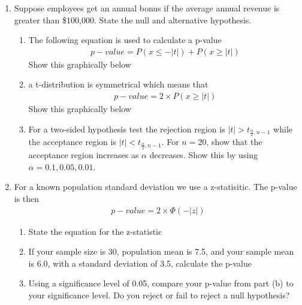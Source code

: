 \begin{enumerate}
\item Suppose employees get an annual bonus if the average annual revenue is greater than \$100,000. State the null and alternative hypothesis.
\begin{enumerate}
\item The following equation is used to calculate a p-value
\begin{eqnarray*}
p-value = P(x \le -|t|) + P(x \ge |t|)
\end{eqnarray*}
Show this graphically below \\
\item a t-distribution is symmetrical which means that 
\begin{eqnarray*}
p-value = 2 \times P(x \ge |t|)
\end{eqnarray*}
Show this graphically below \\ 
\item For a two-sided hypothesis test the rejection region is $|t| > t_{\frac{\alpha}{2},n-1}$ while the acceptance region is $|t| < t_{\frac{\alpha}{2},n-1}$. For $n=20$, show that the acceptance region increases as $\alpha$ decreases. Show this by using $\alpha = 0.1, 0.05, 0.01$.
\end{enumerate}
\item For a known population standard deviation we use a z-statisitic. The p-value is then 
\begin{eqnarray*}
p-value = 2\times \Phi (-|z|)
\end{eqnarray*}
\begin{enumerate}
\item State the equation for the z-statistic
\item If your sample size is 30, population mean is 7.5, and your sample mean is 6.0, with a standard deviation of 3.5, calculate the p-value
\item Using a significance level of 0.05, compare your p-value from part (b) to your significance level. Do you reject or fail to reject a null hypothesis?
\end{enumerate}
\end{enumerate}
\newpage
